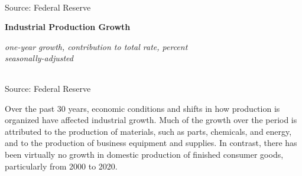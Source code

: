 \documentclass{report}
\makeatletter
\newcommand{\tbllink}[1]{\href{https://raw.githubusercontent.com/bdecon/US-chartbook/master/chartbook/data/#1}{\faTable}}
\newcommand*\short[1]{\expandafter\@gobbletwo\number\numexpr#1\relax}
\newcommand{\shdateaxisticks}{
		date coordinates in=x, axis line style={draw=none},
		xmax={2023-11-01},
		max space between ticks=40,	    
		xtick={{1990-01-01}, {1995-01-01}, {2000-01-01}, 
			{2005-01-01}, {2010-01-01}, {2015-01-01}, {2020-01-01}},
		minor xtick={},
		enlarge y limits={0.06}, enlarge x limits={0.01},
		}
\newcommand{\bbar}[2]{extra #1 ticks = {{#2}}, extra #1 tick labels = ,
		extra #1 tick style = {grid=major, grid style={thick, black!25}},}
\newcommand{\thinline}[4]{\addplot[no markers, color=#1] 
		table [x=#2, y=#3, col sep=comma] {#4};	}
\newcommand{\rbars}{
		\fill[color=black!10] (axis cs:{1990-07-01},\pgfkeysvalueof{/pgfplots/ymin}) rectangle 
			(axis cs:{1991-03-01}, \pgfkeysvalueof{/pgfplots/ymax});
		\fill[color=black!10] (axis cs:{2007-12-01},\pgfkeysvalueof{/pgfplots/ymin}) rectangle 
			(axis cs:{2009-07-01}, \pgfkeysvalueof{/pgfplots/ymax});
		\fill[color=black!10] (axis cs:{2001-03-01},\pgfkeysvalueof{/pgfplots/ymin}) rectangle 
			(axis cs:{2001-11-01}, \pgfkeysvalueof{/pgfplots/ymax});
		\fill[color=black!10] (axis cs:{2020-02-01},\pgfkeysvalueof{/pgfplots/ymin}) rectangle 
			(axis cs:{2020-05-01}, \pgfkeysvalueof{/pgfplots/ymax});}
\makeatother
\begin{document}
{\begin{minipage}{0.42\textwidth}
\hspace*{-1mm}\\
\footnotesize{Source: Federal Reserve} \hfill \tbllink{indpro.csv}
\end{minipage}
\vspace{2mm} 

\begin{minipage}{0.76\textwidth}
\normalsize \textbf{Industrial Production Growth}\\
\footnotesize{\textit{one-year growth, \hspace{27mm} contribution to total \hspace{10mm} rate, percent}\\
\footnotesize{\textit{seasonally-adjusted}}
\vspace*{-7mm}

\hspace*{-2mm}  \setlength{\tabcolsep}{3.7pt} \color{black!90}
		{\renewcommand{\arraystretch}{1.48}
		 \begin{tabular}{p{42mm} R{6.6mm} R{6.6mm} R{6.6mm} R{6.6mm} | 
		 R{6.8mm} R{6.6mm} R{6.6mm} R{6.6mm} }
			  \hline
		\end{tabular}}\vspace{-2mm}
		
\footnotesize{Source: Federal Reserve} \hfill \tbllink{indpro_table.csv}}
\end{minipage}
\newpage
\begin{minipage}{0.76\textwidth} 
\small Over the past 30 years, economic conditions and shifts in how production is organized have affected industrial growth. Much of the growth over the period is attributed to the production of materials, such as parts, chemicals, and energy, and to the production of business equipment and supplies. In contrast, there has been virtually no growth in domestic production of finished consumer goods, particularly from 2000 to 2020. 


\end{minipage}}
\end{document}
